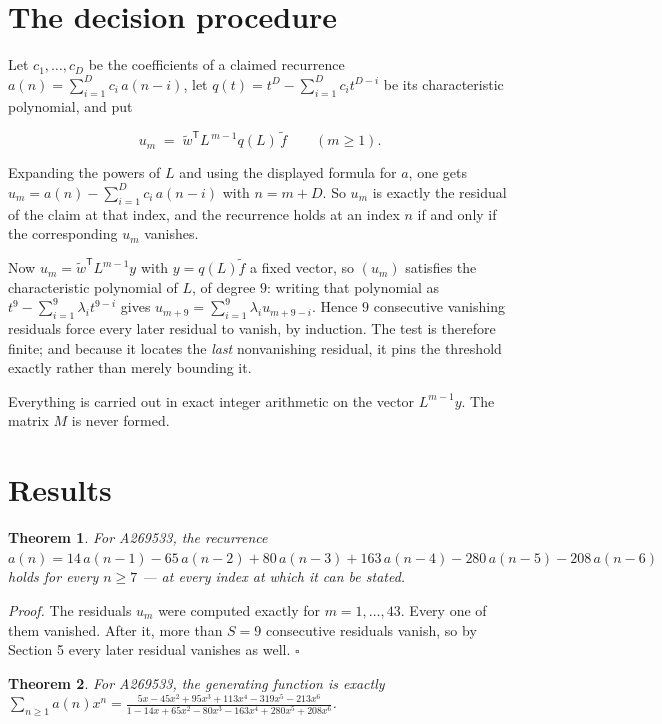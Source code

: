 \documentclass[11pt]{article}
\newtheorem{theorem}{Theorem}
\theoremstyle{definition}
\begin{document}
\section{The decision procedure}

Let $c_1,\dots,c_D$ be the coefficients of a claimed recurrence $a(n) = \sum_{i=1}^{D} c_i\,a(n-i)$, let $q(t) = t^{D} - \sum_{i=1}^{D} c_i t^{D-i}$ be its characteristic polynomial, and put

\[u_m \;=\; \tilde w^{\mathsf T} L^{\,m-1} q(L)\,\tilde f \qquad (m \ge 1).\]

Expanding the powers of $L$ and using the displayed formula for $a$, one gets $u_m = a(n) - \sum_{i=1}^{D} c_i\,a(n-i)$ with $n = m + D$. So $u_m$ is exactly the residual of the claim at that index, and the recurrence holds at an index $n$ if and only if the corresponding $u_m$ vanishes.

Now $u_m = \tilde w^{\mathsf T} L^{m-1} y$ with $y = q(L)\tilde f$ a fixed vector, so $(u_m)$ satisfies the characteristic polynomial of $L$, of degree $9$: writing that polynomial as $t^{9} - \sum_{i=1}^{9} \lambda_i t^{9-i}$ gives $u_{m+9} = \sum_{i=1}^{9} \lambda_i u_{m+9-i}$. Hence $9$ consecutive vanishing residuals force every later residual to vanish, by induction. The test is therefore finite; and because it locates the {\itshape last} nonvanishing residual, it pins the threshold exactly rather than merely bounding it.

Everything is carried out in exact integer arithmetic on the vector $L^{m-1}y$. The matrix $M$ is never formed.

\section{Results}

\begin{theorem} For A269533, the recurrence $a(n) = 14\,a(n-1) - 65\,a(n-2) + 80\,a(n-3) + 163\,a(n-4) - 280\,a(n-5) - 208\,a(n-6)$ holds for every $n \ge 7$ --- at every index at which it can be stated.\end{theorem}

{\itshape Proof.} The residuals $u_m$ were computed exactly for $m = 1,\dots,43$. Every one of them vanished. After it, more than $S = 9$ consecutive residuals vanish, so by Section 5 every later residual vanishes as well. $\square$

\begin{theorem} For A269533, the generating function is exactly $\sum_{n\ge 1} a(n)x^n = \frac{5x - 45x^{2} + 95x^{3} + 113x^{4} - 319x^{5} - 213x^{6}}{1 - 14x + 65x^{2} - 80x^{3} - 163x^{4} + 280x^{5} + 208x^{6}}$.\end{theorem}
\end{document}
